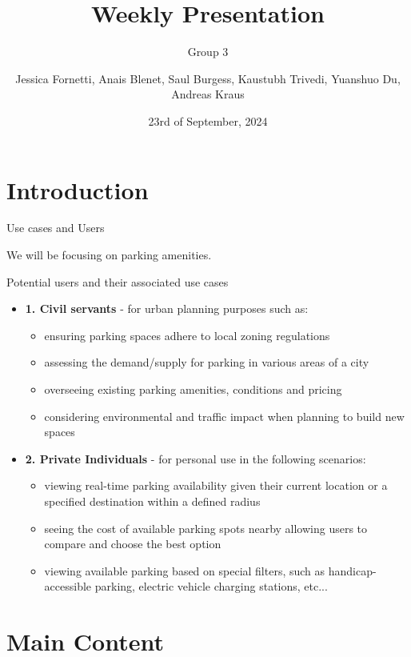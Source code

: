\documentclass{beamer}
\title[Weekly Presentation]{Weekly Presentation}
\subtitle{Group 3}
\author{Jessica Fornetti, Anais Blenet, Saul Burgess, Kaustubh Trivedi, Yuanshuo Du, Andreas Kraus}
\institute{TU Dublin}
\date{23rd of September, 2024} %
\begin{document}
\begin{frame}
    \titlepage{}
\end{frame}

\section{Introduction}

\begin{frame}{Use cases and Users}
    \item We will be focusing on parking amenities.
    \item{Potential users and their associated use cases}
    \begin{itemize}
        \item{\textbf{1. Civil servants}} - for urban planning purposes such as:
        \begin{itemize}
            \item ensuring parking spaces adhere to local zoning regulations
            \item assessing the demand/supply for parking in various areas of a city
            \item overseeing existing parking amenities, conditions and pricing
            \item considering environmental and traffic impact when planning to build new spaces
        \end{itemize} 
        \item{\textbf{2. Private Individuals}} - for personal use in the following scenarios:
        \begin{itemize}
            \item viewing real-time parking availability given their current location or a specified destination within a defined radius
            \item  seeing the cost of available parking spots  nearby allowing users to compare and choose the best option
            \item viewing available parking based on special filters, such as handicap-accessible parking, electric vehicle charging stations, etc...
        \end{itemize} 
    \end{itemize}
\end{frame}

\section{Main Content}
\end{document}
